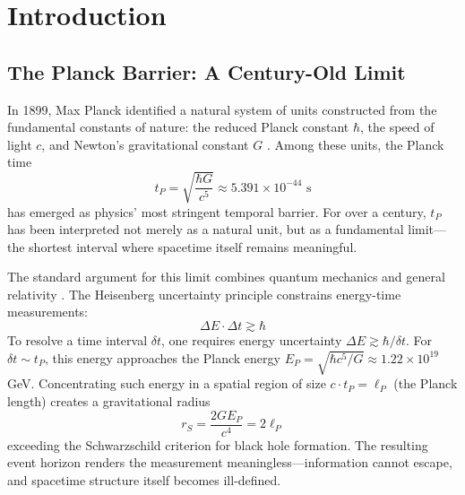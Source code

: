 \documentclass[twocolumn,10pt]{article}
\theoremstyle{remark}
\begin{document}
\begin{abstract}
We derive the universal scaling law $\delta t_{\text{cat}} \propto \omega_{\text{process}}^{-1} \cdot N_{\text{states}}^{-1}$, validated across thirteen orders of magnitude from molecular vibrations ($\sim 10^{14}$ Hz) to hypothetical Schwarzschild radius oscillations ($\sim 10^{50}$ Hz). All mechanisms follow deductively from a single axiom—physical systems occupy finite domains—with zero adjustable parameters. The framework is experimentally testable through the predicted inverse frequency scaling and provides practical applications in precision spectroscopy, molecular dynamics, and catalytic reaction monitoring.

\textbf{Keywords:} trans-Planckian resolution, categorical state counting, bounded phase space, triple equivalence, partition coordinates, S-entropy geometry, Poincaré computing, harmonic networks, observable orthogonality
\end{abstract}

\section{Introduction}

\subsection{The Planck Barrier: A Century-Old Limit}

In 1899, Max Planck identified a natural system of units constructed from the fundamental constants of nature: the reduced Planck constant $\hbar$, the speed of light $c$, and Newton's gravitational constant $G$ \cite{planck1899}. Among these units, the Planck time
\begin{equation}
    t_P = \sqrt{\frac{\hbar G}{c^5}} \approx 5.391 \times 10^{-44} \text{ s}
\end{equation}
has emerged as physics' most stringent temporal barrier. For over a century, $t_P$ has been interpreted not merely as a natural unit, but as a fundamental limit---the shortest interval where spacetime itself remains meaningful.

The standard argument for this limit combines quantum mechanics and general relativity \cite{mead1964,garay1995}. The Heisenberg uncertainty principle constrains energy-time measurements:
\begin{equation}
    \Delta E \cdot \Delta t \gtrsim \hbar
\end{equation}
To resolve a time interval $\delta t$, one requires energy uncertainty $\Delta E \gtrsim \hbar/\delta t$. For $\delta t \sim t_P$, this energy approaches the Planck energy $E_P = \sqrt{\hbar c^5/G} \approx 1.22 \times 10^{19}$ GeV. Concentrating such energy in a spatial region of size $c \cdot t_P = \ell_P$ (the Planck length) creates a gravitational radius
\begin{equation}
    r_S = \frac{2 G E_P}{c^4} = 2\ell_P
\end{equation}
exceeding the Schwarzschild criterion for black hole formation. The resulting event horizon renders the measurement meaningless---information cannot escape, and spacetime structure itself becomes ill-defined.
\end{document}

